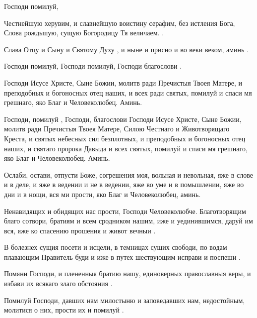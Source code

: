 \begin{mymulticols}
 Господи помилуй,  

Честнейшую херувим, и славнейшую воистину серафим, без истления Бога, Слова рождьшую, сущую Богородицу Тя величаем. .

Слава Отцу и Сыну и Святому Духу , и ныне и присно и во веки веком, аминь .

Господи помилуй, Господи помилуй, Господи благослови .

 Господи Исусе Христе, Сыне Божии, молитв ради Пречистыя Твоея Матере, и преподобных и богоносных отец наших, и всех ради святых, помилуй и спаси мя грешнаго, яко Благ и Человеколюбец. Аминь.



  Господи, помилуй , Господи, благослови  Господи Исусе Христе, Сыне Божии, молитв ради Пречистыя Твоея Матере, Силою Честнаго и Животворящаго Креста, и святых небесных сил безплотных, и преподобных и богоносных отец наших, и святаго пророка Давыда  и всех святых, помилуй и спаси мя грешнаго, яко Благ и Человеколюбец. Аминь.


Ослаби, остави, отпусти Боже, согрешения моя, вольная и невольная, яже в слове и в деле, и яже в ведении и не в ведении, яже во уме и в помышлении, яже во дни и в нощи, вся ми прости, яко Благ и Человеколюбец, аминь.


Ненавидящих и обидящих нас прости, Господи Человеколюбче. Благотворящим благо сотвори, братиям и всем сродником нашим, иже и уединившимся, даруй им вся, яже ко спасению прошения и живот вечныи .

В болезнех сущия посети и исцели, в темницах сущих свободи, по водам плавающим Правитель буди и иже в путех шествующим исправи и поспеши .

Помяни Господи, и плененныя братию нашу, единоверных православныя веры, и избави их всякаго злаго обстояния .

Помилуй Господи, давших нам милостыню и заповедавших нам, недостойным, молитися о них, прости их и помилуй .


\end{mymulticols}
